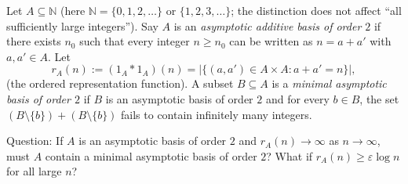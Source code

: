 Let $A\subseteq\mathbb{N}$ (here $\mathbb{N}=\{0,1,2,\dots\}$ or $\{1,2,3,\dots\}$; the distinction does not affect ``all sufficiently large integers'').
Say $A$ is an \emph{asymptotic additive basis of order $2$} if there exists $n_0$ such that every integer $n\ge n_0$ can be written as $n=a+a'$ with $a,a'\in A$.
Let
\[
 r_A(n):=(1_A*1_A)(n)=\bigl|\{(a,a')\in A\times A: a+a'=n\}\bigr|,
\]
(the ordered representation function).
A subset $B\subseteq A$ is a \emph{minimal asymptotic basis of order $2$} if $B$ is an asymptotic basis of order $2$ and for every $b\in B$, the set $(B\setminus\{b\})+(B\setminus\{b\})$ fails to contain infinitely many integers.

Question: If $A$ is an asymptotic basis of order $2$ and $r_A(n)\to\infty$ as $n\to\infty$, must $A$ contain a minimal asymptotic basis of order $2$? What if $r_A(n)\ge \varepsilon\log n$ for all large $n$?
